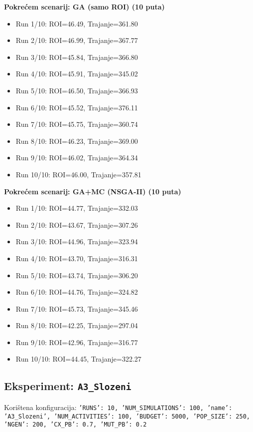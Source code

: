 \textbf{Pokrećem scenarij: GA (samo ROI) (10 puta)}
\begin{itemize}
    \item Run 1/10: ROI=46.49, Trajanje=361.80
    \item Run 2/10: ROI=46.99, Trajanje=367.77
    \item Run 3/10: ROI=45.84, Trajanje=366.80
    \item Run 4/10: ROI=45.91, Trajanje=345.02
    \item Run 5/10: ROI=46.50, Trajanje=366.93
    \item Run 6/10: ROI=45.52, Trajanje=376.11
    \item Run 7/10: ROI=45.75, Trajanje=360.74
    \item Run 8/10: ROI=46.23, Trajanje=369.00
    \item Run 9/10: ROI=46.02, Trajanje=364.34
    \item Run 10/10: ROI=46.00, Trajanje=357.81
\end{itemize}

\textbf{Pokrećem scenarij: GA+MC (NSGA-II) (10 puta)}
\begin{itemize}
    \item Run 1/10: ROI=44.77, Trajanje=332.03
    \item Run 2/10: ROI=43.67, Trajanje=307.26
    \item Run 3/10: ROI=44.96, Trajanje=323.94
    \item Run 4/10: ROI=43.70, Trajanje=316.31
    \item Run 5/10: ROI=43.74, Trajanje=306.20
    \item Run 6/10: ROI=44.76, Trajanje=324.82
    \item Run 7/10: ROI=45.73, Trajanje=345.46
    \item Run 8/10: ROI=42.25, Trajanje=297.04
    \item Run 9/10: ROI=42.96, Trajanje=316.77
    \item Run 10/10: ROI=44.45, Trajanje=322.27
\end{itemize}

\subsection*{Eksperiment: \texttt{A3\_Slozeni}}
Korištena konfiguracija: \texttt{'RUNS': 10, 'NUM\_SIMULATIONS': 100, 'name': 'A3\_Slozeni', 'NUM\_ACTIVITIES': 100, 'BUDGET': 5000, 'POP\_SIZE': 250, 'NGEN': 200, 'CX\_PB': 0.7, 'MUT\_PB': 0.2}

